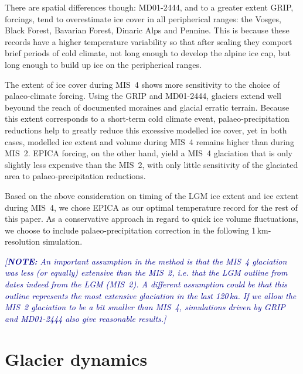 \documentclass[tc, manuscript]{copernicus}
\newcommand{\note}[1]{\textcolor{darkblue}{\emph{[\textbf{NOTE:} #1]}}}
\begin{document}
    There are spatial differences though: MD01-2444, and to a greater extent
    GRIP, forcings, tend to overestimate ice cover in all peripherical ranges:
    the Vosges, Black Forest, Bavarian Forest, Dinaric Alps and Pennine. This
    is because these records have a higher temperature variability so that
    after scaling they comport brief periods of cold climate, not long enough
    to develop the alpine ice cap, but long enough to build up ice on the
    peripherical ranges.

    The extent of ice cover during MIS~4 shows more sensitivity to the choice
    of palaeo-climate forcing. Using the GRIP and MD01-2444, glaciers extend
    well beyound the reach of documented moraines and glacial erratic terrain.
    Because this extent corresponds to a short-term cold climate event,
    palaeo-precipitation reductions help to greatly reduce this excessive
    modelled ice cover, yet in both cases, modelled ice extent and volume
    during MIS~4 remains higher than during MIS~2. EPICA forcing, on the other
    hand, yield a MIS~4 glaciation that is only slightly less expensive than
    the MIS~2, with only little sensitivity of the glaciated area to
    palaeo-precipitation reductions.

    Based on the above consideration on timing of the LGM ice extent and
    ice extent during MIS~4, we chose EPICA as our optimal temperature record
    for the rest of this paper. As a conservative approach in regard to quick
    ice volume fluctuations, we choose to include palaeo-precipitation
    correction in the following 1\,km-resolution simulation.

    \note{An important assumption in the method is that the MIS~4 glaciation
          was less (or equally) extensive than the MIS~2, i.e. that the LGM
          outline from \citet{Ehlers.etal.2011} dates indeed from the LGM
          (MIS~2). A different assumption could be that this outline represents
          the most extensive glaciation in the last 120\,ka. If we allow the
          MIS~2 glaciation to be a bit smaller than MIS~4, simulations driven
          by GRIP and MD01-2444 also give reasonable results.}


\section{Glacier dynamics}
\label{sec:results}
\end{document}
